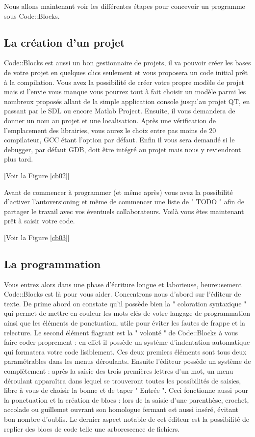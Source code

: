\documentclass[a4paper, 12pt]{article}
\begin{document}
\begin{onehalfspacing}

Nous allons maintenant voir les différentes étapes pour concevoir un programme sous Code::Blocks.

\subsection{La création d'un projet}
Code::Blocks est aussi un bon gestionnaire de projets, il va pouvoir créer les bases de votre projet en quelques clics seulement et vous proposera un code initial prêt à la compilation. Vous avez la possibilité de créer votre propre modèle de projet mais si l'envie vous manque vous pourrez tout à fait choisir un modèle parmi les nombreux proposés allant de la simple application console jusqu'au projet QT, en passant par le SDL ou encore Matlab Project. Ensuite, il vous demandera de donner un nom au projet et une localisation. Après une vérification de l'emplacement des librairies, vous aurez le choix entre pas moins de 20 compilateur, GCC étant l'option par défaut. Enfin il vous sera demandé si le debugger, par défaut GDB, doit être intégré au projet mais nous y reviendront plus tard. 

[Voir la Figure \ref{cb02}]

Avant de commencer à programmer (et même après) vous avez la possibilité d'activer l'autoversioning et même de commencer une liste de " TODO " afin de partager le travail avec vos éventuels collaborateurs. Voilà vous êtes maintenant prêt à saisir votre code.

[Voir la Figure \ref{cb03}]



\subsection{La programmation}
Vous entrez alors dans une phase d'écriture longue et laborieuse, heureusement Code::Blocks est là pour vous aider. Concentrons nous d'abord sur l'éditeur de texte. De prime abord on constate qu'il possède bien la " coloration syntaxique " qui permet de mettre en couleur les mots-clés de votre langage de programmation ainsi que les éléments de ponctuation, utile pour éviter les fautes de frappe et la relecture. Le second élément flagrant est la " volonté " de Code::Blocks à vous faire coder proprement : en effet il possède un système d'indentation automatique qui formatera votre code lisiblement. Ces deux premiers éléments sont tous deux paramétrables dans les menus déroulants. Ensuite l'éditeur possède un système de complètement : après la saisie des trois premières lettres d'un mot, un menu déroulant apparaîtra dans lequel se trouveront toutes les possibilités de saisies, libre à vous de choisir la bonne et de taper " Entrée ". Ceci fonctionne aussi pour la ponctuation et la création de blocs : lors de la saisie d'une parenthèse, crochet, accolade ou guillemet ouvrant son homologue fermant est aussi inséré, évitant bon nombre d'oublis. Le dernier aspect notable de cet éditeur est la possibilité de replier des blocs de code telle une arborescence de fichiers.


\end{onehalfspacing}
\end{document}
